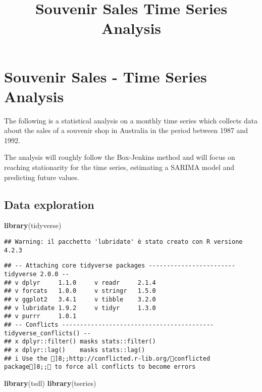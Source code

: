 \documentclass[
]{article}
\title{Souvenir Sales Time Series Analysis}
\author{}
\date{\vspace{-2.5em}}
\newenvironment{Shaded}{\begin{snugshade}}{\end{snugshade}}
\newcommand{\FunctionTok}[1]{\textcolor[rgb]{0.13,0.29,0.53}{\textbf{#1}}}
\newcommand{\NormalTok}[1]{#1}
\begin{document}
\maketitle

\hypertarget{souvenir-sales---time-series-analysis}{%
\section{Souvenir Sales - Time Series
Analysis}\label{souvenir-sales---time-series-analysis}}

The following is a statistical analysis on a monthly time series which
collects data about the sales of a souvenir shop in Australia in the
period between 1987 and 1992.

The analysis will roughly follow the Box-Jenkins method and will focus
on reaching stationarity for the time series, estimating a SARIMA model
and predicting future values.

\hypertarget{data-exploration}{%
\subsection{Data exploration}\label{data-exploration}}

\begin{Shaded}
\begin{Highlighting}[]
\FunctionTok{library}\NormalTok{(tidyverse)}
\end{Highlighting}
\end{Shaded}

\begin{verbatim}
## Warning: il pacchetto 'lubridate' è stato creato con R versione 4.2.3
\end{verbatim}

\begin{verbatim}
## -- Attaching core tidyverse packages ------------------------ tidyverse 2.0.0 --
## v dplyr     1.1.0     v readr     2.1.4
## v forcats   1.0.0     v stringr   1.5.0
## v ggplot2   3.4.1     v tibble    3.2.0
## v lubridate 1.9.2     v tidyr     1.3.0
## v purrr     1.0.1     
## -- Conflicts ------------------------------------------ tidyverse_conflicts() --
## x dplyr::filter() masks stats::filter()
## x dplyr::lag()    masks stats::lag()
## i Use the ]8;;http://conflicted.r-lib.org/conflicted package]8;; to force all conflicts to become errors
\end{verbatim}

\begin{Shaded}
\begin{Highlighting}[]
\FunctionTok{library}\NormalTok{(tsdl)}
\FunctionTok{library}\NormalTok{(tseries)}
\end{Highlighting}
\end{Shaded}
\end{document}
